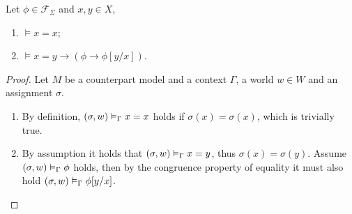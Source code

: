 \begin{lemma}\label{lem:equality}
  Let $\phi \in \mathcal{F}_\Sigma$ and $x, y \in X$,
  \begin{enumerate}
    \item $\vDash x = x$;
    \item $\vDash x = y \to (\phi \to \phi[y/x])$.
  \end{enumerate}
\end{lemma}
\begin{proof}
  Let $M$ be a counterpart model and a context $\Gamma$, a world $w \in W$ and an assignment $\sigma$.
  \begin{enumerate}
    \item By definition, $({\sigma}, {w}) \vDash_{\Gamma} {x = x}$ holds if $\sigma(x) = \sigma(x)$, which is trivially true.
    \item By assumption it holds that $({\sigma}, {w}) \vDash_{\Gamma} {x = y}$, thus $\sigma(x) = \sigma(y)$. Assume
      $({\sigma}, {w}) \vDash_{\Gamma} {\phi}$ holds, then by the congruence property of equality it must also hold
      $({\sigma}, {w}) \vDash_{\Gamma} {\phi[y/x]}$.
  \end{enumerate}
\end{proof}

